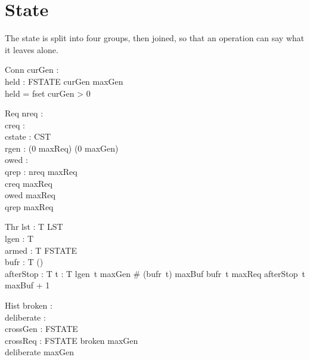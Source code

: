 \documentclass[a4paper,10pt,fleqn]{article}
\begin{document}
\section{State}

The state is split into four groups, then joined, so that an operation can
say what it leaves alone.

\begin{schema}{Conn}
  curGen : \nat \\
  held : FSTATE
\where
  curGen \leq maxGen \\
  held = fset \implies curGen > 0
\end{schema}

\begin{schema}{Req}
  nreq : \nat \\
  creq : \nat \\
  cstate : CST \\
  rgen : (0 \upto maxReq) \fun (0 \upto maxGen) \\
  owed : \power \nat \\
  qrep : \power \nat
\where
  nreq \leq maxReq \\
  creq \leq maxReq \\
  owed  \upto maxReq \\
  qrep  \upto maxReq
\end{schema}

\begin{schema}{Thr}
  lst : T \fun LST \\
  lgen : T \fun \nat \\
  armed : T \fun FSTATE \\
  bufr : T \fun (\power \nat) \\
  afterStop : T \fun \nat
\where
  \forall t : T \spot lgen~t \leq maxGen \land \# (bufr~t) \leq maxBuf
    \land bufr~t  \upto maxReq \land afterStop~t \leq maxBuf + 1
\end{schema}

\begin{schema}{Hist}
  broken : \power \nat \\
  deliberate : \power \nat \\
  crossGen : FSTATE \\
  crossReq : FSTATE
\where
  broken  \upto maxGen \\
  deliberate  \upto maxGen
\end{schema}
\end{document}
